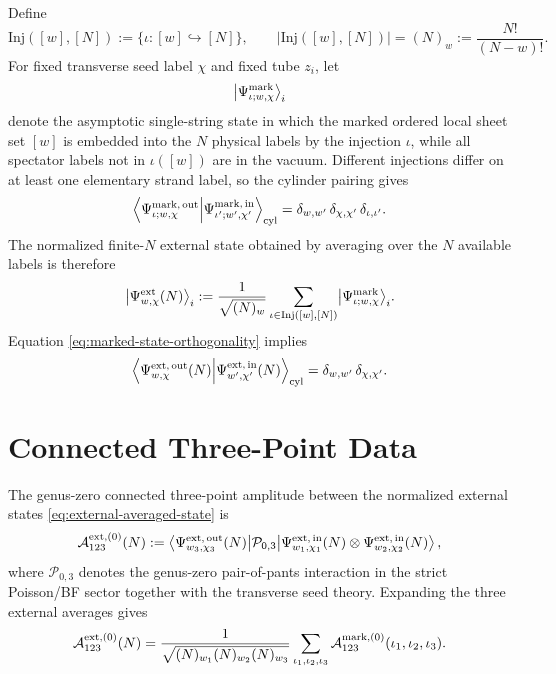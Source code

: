 \documentclass[11pt]{article}
\newcommand{\mc}[1]{\mathcal{#1}}
\newcommand{\Inj}{\mathrm{Inj}}
\begin{document}
Define
\begin{equation}\label{eq:ordered-injections}
\Inj([w],[N])
:=
\{\iota:[w]\hookrightarrow [N]\},
\qquad
|\Inj([w],[N])|=(N)_w:=\frac{N!}{(N-w)!}.
\end{equation}
For fixed transverse seed label $\chi$ and fixed tube $z_i$, let
\begin{equation}\label{eq:marked-labeled-state}
\bigl|\Psi^{\rm mark}_{\iota;w,\chi}\bigr\rangle_i
\end{equation}
denote the asymptotic single-string state in which the marked ordered local sheet set $[w]$ is embedded into the $N$ physical labels by the injection $\iota$, while all spectator labels not in $\iota([w])$ are in the vacuum. Different injections differ on at least one elementary strand label, so the cylinder pairing gives
\begin{equation}\label{eq:marked-state-orthogonality}
\left\langle
\Psi_{\iota;w,\chi}^{\rm mark,\,out}
\middle|
\Psi_{\iota';w',\chi'}^{\rm mark,\,in}
\right\rangle_{\rm cyl}
=
\delta_{w,w'}\,\delta_{\chi,\chi'}\,\delta_{\iota,\iota'}.
\end{equation}
The normalized finite-$N$ external state obtained by averaging over the $N$ available labels is therefore
\begin{equation}\label{eq:external-averaged-state}
\bigl|\Psi_{w,\chi}^{\rm ext}(N)\bigr\rangle_i
:=
\frac{1}{\sqrt{(N)_w}}
\sum_{\iota\in \Inj([w],[N])}
\bigl|\Psi^{\rm mark}_{\iota;w,\chi}\bigr\rangle_i.
\end{equation}
Equation \eqref{eq:marked-state-orthogonality} implies
\begin{equation}\label{eq:external-state-unit-norm}
\left\langle
\Psi_{w,\chi}^{\rm ext,\,out}(N)
\middle|
\Psi_{w',\chi'}^{\rm ext,\,in}(N)
\right\rangle_{\rm cyl}
=
\delta_{w,w'}\,\delta_{\chi,\chi'}.
\end{equation}

\section{Connected Three-Point Data}
The genus-zero connected three-point amplitude between the normalized external states \eqref{eq:external-averaged-state} is
\begin{equation}\label{eq:external-averaged-amplitude}
\mc A_{123}^{\rm ext,(0)}(N)
:=
\left\langle
\Psi^{\rm ext,\,out}_{w_3,\chi_3}(N)
\middle|
\mc P_{0,3}
\middle|
\Psi^{\rm ext,\,in}_{w_1,\chi_1}(N)\otimes
\Psi^{\rm ext,\,in}_{w_2,\chi_2}(N)
\right\rangle,
\end{equation}
where $\mc P_{0,3}$ denotes the genus-zero pair-of-pants interaction in the strict Poisson/BF sector together with the transverse seed theory. Expanding the three external averages gives
\begin{equation}\label{eq:external-averaged-amplitude-expanded}
\mc A_{123}^{\rm ext,(0)}(N)
=
\frac{1}{\sqrt{(N)_{w_1}(N)_{w_2}(N)_{w_3}}}
\sum_{\iota_1,\iota_2,\iota_3}
\mc A_{123}^{\rm mark,(0)}(\iota_1,\iota_2,\iota_3).
\end{equation}
\end{document}
